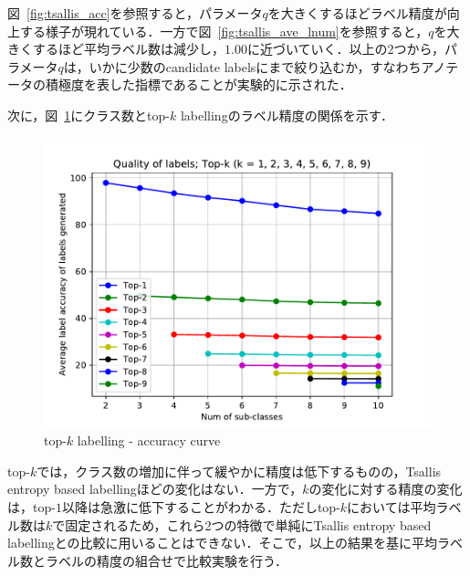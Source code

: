 \documentclass[a4paper,conference]{IEEEtran}
\begin{document}
図~\ref{fig:tsallis_acc}を参照すると，パラメータ$q$を大きくするほどラベル精度が向上する様子が現れている．一方で図~\ref{fig:tsallis_ave_lnum}を参照すると，$q$を大きくするほど平均ラベル数は減少し，$1.00$に近づいていく．以上の2つから，パラメータ$q$は，いかに少数のcandidate labelsにまで絞り込むか，すなわちアノテータの積極度を表した指標であることが実験的に示された．

次に，図~\ref{fig:top-k}にクラス数とtop-$k$ labellingのラベル精度の関係を示す．
\begin{figure}[t]
\begin{center}
    \includegraphics[width=1.0\linewidth]{figs/graphs/topk-labels-acc.pdf}
    \caption{top-$k$ labelling - accuracy curve}
    \label{fig:top-k}
\end{center}
\end{figure}

top-$k$では，クラス数の増加に伴って緩やかに精度は低下するものの，Tsallis entropy based labellingほどの変化はない．一方で，$k$の変化に対する精度の変化は，top-$1$以降は急激に低下することがわかる．ただしtop-$k$においては平均ラベル数は$k$で固定されるため，これら2つの特徴で単純にTsallis entropy based labellingとの比較に用いることはできない．そこで，以上の結果を基に平均ラベル数とラベルの精度の組合せで比較実験を行う．
\end{document}
